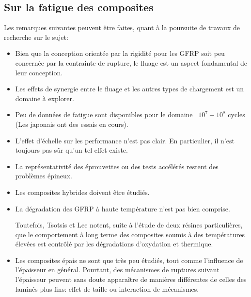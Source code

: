 \medskip
\subsection{Sur la fatigue des composites}
Les remarques suivantes peuvent être faites, quant à la poursuite de travaux de recherche sur le sujet:
\begin{itemize}
  \item Bien que la conception orientée par la rigidité pour les GFRP
     soit peu concernée par la contrainte de rupture, le fluage
     est un aspect fondamental de leur conception.
  \item Les effets de synergie entre le fluage et les autres types
     de chargement est un domaine à explorer.
  \item Peu de données de fatigue sont disponibles pour le domaine
    ~$10^7-10^8$ cycles (Les japonais ont des essais en cours).
  \item L'effet d'échelle sur les performance n'est pas clair.
     En particulier, il n'est toujours pas sûr qu'un tel effet
     existe.
  \item La représentativité des éprouvettes ou des tests accélérés
     restent des problèmes épineux.
  \item Les composites hybrides doivent être étudiés.
  \item La dégradation des GFRP à haute température n'est pas
     bien comprise.

     Toutefois, Tsotsis et Lee notent, suite à l'étude de deux résines particulières, que le comportement à long terme des composites soumis à des températures élevées est contrôlé par les dégradations d'oxydation et thermique.

  \item Les composites épais ne sont que très peu étudiés, tout comme
     l'influence de l'épaisseur en général.
     Pourtant, des mécanismes de ruptures suivant l'épaisseur peuvent
     sans doute apparaître de manières différentes de celles des
     laminés plus fins: effet de taille ou interaction de mécanismes.
\end{itemize}
